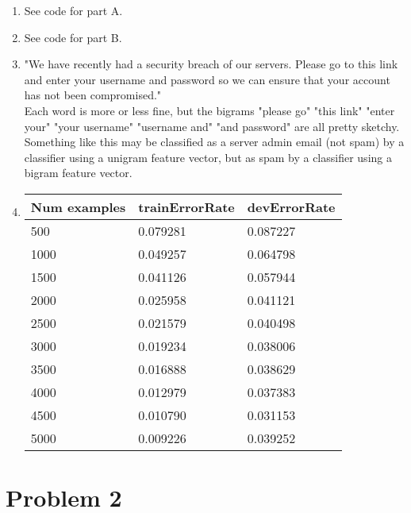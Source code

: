 \documentclass[12pt]{article}
\begin{document}
\begin{enumerate}[label=(\alph*)]
  \item See code for part A.
  \item See code for part B.

  \item "We have recently had a security breach of our servers. Please go to this link and enter your username and password so we can ensure that your account has not been compromised."\\
  Each word is more or less fine, but the bigrams "please go" "this link" "enter your" "your username" "username and" "and password" are all pretty sketchy. Something like this may be classified as a server admin email (not spam) by a classifier using a unigram feature vector, but as spam by a classifier using a bigram feature vector.
  \item 
  \begin{tabular}{ l | p{3cm} | p{3cm} }
	    \hline
	    Num examples & trainErrorRate & devErrorRate\\ \hline
	    500 & 
		0.079281 & 0.087227 \\ \hline
		1000 & 
		0.049257 & 0.064798 \\ \hline
		1500 & 
		0.041126 & 0.057944 \\ \hline
		2000 & 
		0.025958 & 0.041121 \\ \hline
		2500 & 
		0.021579 & 0.040498 \\ \hline
		3000 & 
		0.019234 & 0.038006 \\ \hline
		3500 & 
		0.016888 & 0.038629 \\ \hline
		4000 & 
		0.012979 & 0.037383 \\ \hline
		4500 & 
		0.010790 & 0.031153 \\ \hline
		5000 & 
		0.009226 & 0.039252 \\ \hline
	  \end{tabular}
\end{enumerate}

\section*{Problem 2}
\end{document}
